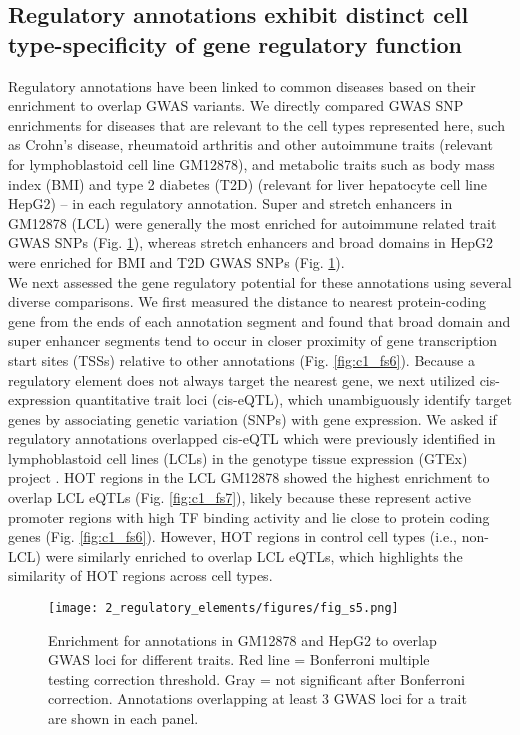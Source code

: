 \subsection{Regulatory annotations exhibit distinct cell type-specificity of gene regulatory function}
Regulatory annotations have been linked to common diseases based on their enrichment to overlap GWAS variants. We directly compared GWAS SNP enrichments for diseases that are relevant to the cell types represented here, such as Crohn’s disease, rheumatoid arthritis and other autoimmune traits (relevant for lymphoblastoid cell line GM12878), and metabolic traits such as body mass index (BMI) and type 2 diabetes (T2D) (relevant for liver hepatocyte cell line HepG2) – in each regulatory annotation. Super and stretch enhancers in GM12878 (LCL) were generally the most enriched for autoimmune related trait GWAS SNPs (Fig. \ref{fig:c1_fs5}), whereas stretch enhancers and broad domains in HepG2 were enriched for BMI and T2D GWAS SNPs (Fig. \ref{fig:c1_fs5}). \\
We next assessed the gene regulatory potential for these annotations using several diverse comparisons. We first measured the distance to nearest protein-coding gene from the ends of each annotation segment and found that broad domain and super enhancer segments tend to occur in closer proximity of gene transcription start sites (TSSs) relative to other annotations (Fig. \ref{fig:c1_fs6}). Because a regulatory element does not always target the nearest gene, we next utilized cis-expression quantitative trait loci (cis-eQTL), which unambiguously identify target genes by associating genetic variation (SNPs) with gene expression. We asked if regulatory annotations overlapped cis-eQTL which were previously identified in lymphoblastoid cell lines (LCLs) in the genotype tissue expression (GTEx) project \cite{gtexconsortiumGeneticEffectsGene2017}. HOT regions in the LCL GM12878 showed the highest enrichment to overlap LCL eQTLs (Fig. \ref{fig:c1_fs7}), likely because these represent active promoter regions with high TF binding activity and lie close to protein coding genes (Fig. \ref{fig:c1_fs6}). However, HOT regions in control cell types (i.e., non-LCL) were similarly enriched to overlap LCL eQTLs, which highlights the similarity of HOT regions across cell types. \\

\begin{figure}
    \centering
    \texttt{[image: 2\_regulatory\_elements/figures/fig\_s5.png]}
    \caption[Enrichment for annotations in GM12878 and HepG2 to overlap GWAS loci for different traits]{Enrichment for annotations in GM12878 and HepG2 to overlap GWAS loci for different traits. Red line = Bonferroni multiple testing correction threshold. Gray = not significant after Bonferroni correction. Annotations overlapping at least 3 GWAS loci for a trait are shown in each panel.}
    \label{fig:c1_fs5}
\end{figure}

